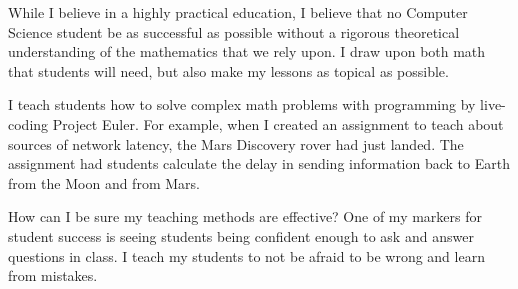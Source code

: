\documentclass[10pt, a4paper]{article}
\begin{document}
While I believe in a highly practical education, I believe that no Computer Science student be as successful as possible without a rigorous theoretical understanding of the mathematics that we rely upon.
I draw upon both math that students will need, but also make my lessons as topical as possible.

I teach students how to solve complex math problems with programming by live-coding Project Euler.
For example, when I created an assignment to teach about sources of network latency, the Mars Discovery rover had just landed.
The assignment had students calculate the delay in sending information back to Earth from the Moon and from Mars.



How can I be sure my teaching methods are effective?
One of my markers for student success is seeing students being confident enough to ask and answer questions in class.
I teach my students to not be afraid to be wrong and learn from mistakes.
\end{document}
